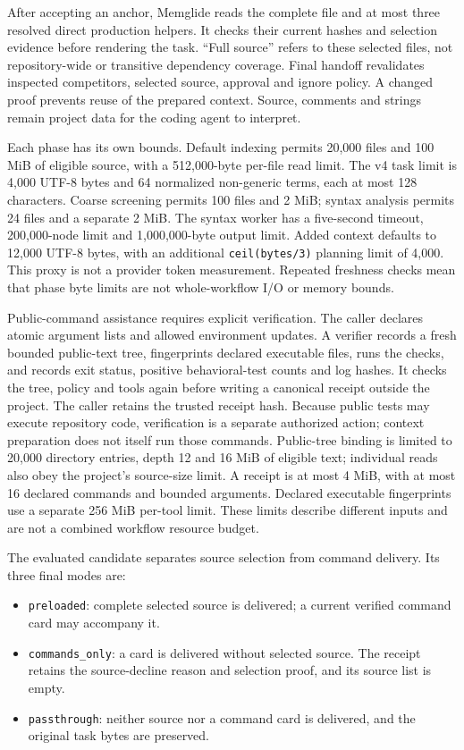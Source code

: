 \documentclass[manuscript,screen,nonacm]{acmart}
\providecommand{\tightlist}{\setlength{\itemsep}{0pt}\setlength{\parskip}{0pt}}
\begin{document}
After accepting an anchor, Memglide reads the complete file and at most
three resolved direct production helpers. It checks their current hashes
and selection evidence before rendering the task. ``Full source'' refers
to these selected files, not repository-wide or transitive dependency
coverage. Final handoff revalidates inspected competitors, selected
source, approval and ignore policy. A changed proof prevents reuse of
the prepared context. Source, comments and strings remain project data
for the coding agent to interpret.

Each phase has its own bounds. Default indexing permits 20,000 files and
100 MiB of eligible source, with a 512,000-byte per-file read limit. The
v4 task limit is 4,000 UTF-8 bytes and 64 normalized non-generic terms,
each at most 128 characters. Coarse screening permits 100 files and 2
MiB; syntax analysis permits 24 files and a separate 2 MiB. The syntax
worker has a five-second timeout, 200,000-node limit and 1,000,000-byte
output limit. Added context defaults to 12,000 UTF-8 bytes, with an
additional \texttt{ceil(bytes/3)} planning limit of 4,000. This proxy is
not a provider token measurement. Repeated freshness checks mean that
phase byte limits are not whole-workflow I/O or memory bounds.

Public-command assistance requires explicit verification. The caller
declares atomic argument lists and allowed environment updates. A
verifier records a fresh bounded public-text tree, fingerprints declared
executable files, runs the checks, and records exit status, positive
behavioral-test counts and log hashes. It checks the tree, policy and
tools again before writing a canonical receipt outside the project. The
caller retains the trusted receipt hash. Because public tests may
execute repository code, verification is a separate authorized action;
context preparation does not itself run those commands. Public-tree
binding is limited to 20,000 directory entries, depth 12 and 16 MiB of
eligible text; individual reads also obey the project's source-size
limit. A receipt is at most 4 MiB, with at most 16 declared commands and
bounded arguments. Declared executable fingerprints use a separate 256
MiB per-tool limit. These limits describe different inputs and are not a
combined workflow resource budget.

The evaluated candidate separates source selection from command
delivery. Its three final modes are:

\begin{itemize}
\tightlist
\item
  \texttt{preloaded}: complete selected source is delivered; a current
  verified command card may accompany it.
\item
  \texttt{commands\_only}: a card is delivered without selected source.
  The receipt retains the source-decline reason and selection proof, and
  its source list is empty.
\item
  \texttt{passthrough}: neither source nor a command card is delivered,
  and the original task bytes are preserved.
\end{itemize}
\end{document}
